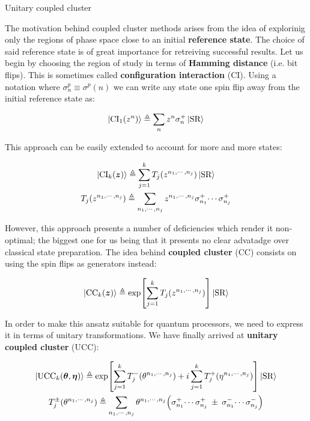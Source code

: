 \documentclass[9pt, handout, aspectratio=169]{beamer}	%
\begin{document}
\begin{frame}[allowframebreaks]{Unitary coupled cluster}

	The motivation behind coupled cluster methods arises from the idea of explorinig only the regions of phase space close to an initial \textbf{reference state}. The choice of said reference state is of great importance for retreiving successful results. Let us begin by choosing the region of study in terms of \textbf{Hamming distance} (i.e. bit flips). This is sometimes called \textbf{configuration interaction} (CI). Using a notation where $\sigma^{p}_{n} \equiv \sigma^{p}(n)$ we can write any state one spin flip away from the initial reference state as:

	\begin{gather*}
	  \ket{\text{CI}_{1} \qty(z^{n})} \triangleq
	    \sum_{n} z^{n} \sigma^{+}_{n} \ket{\text{SR}}
	\end{gather*}

	\vspace{-1em}

	This approach can be easily extended to account for more and more states:

	\begin{gather*}
	  \ket{\text{CI}_{k} \qty(\boldsymbol{z})} \triangleq
	    \sum_{j=1}^{k} T_{j} \qty(z^{n_1,\cdots,n_j}) \ket{\text{SR}} \\
	  T_{j} \qty(z^{n_1,\cdots,n_j}) \triangleq \sum_{n_1,\cdots,n_j}
	    z^{n_1,\cdots,n_j} \sigma^{+}_{n_1} \! \cdots \sigma^{+}_{n_j}
	\end{gather*}

\break

	However, this approach presents a number of deficiencies which render it non-optimal; the biggest one for us being that it presents no clear advatadge over classical state preparation. The idea behind \textbf{coupled cluster} (CC) consists on using the spin flips as generators instead:

	\begin{gather*}
	  \ket{\text{CC}_{k} \qty(\boldsymbol{z})} \triangleq
	    \exp[\sum_{j=1}^{k} T_{j} \qty(z^{n_1,\cdots,n_j})]
	    \ket{\text{SR}}
	\end{gather*}

	In order to make this ansatz suitable for quantum processors, we need to express it in terms of unitary transformations. We have finally arrived at \textbf{unitary coupled cluster} (UCC):

	\begin{gather*}
	  \ket{\text{UCC}_{k} \qty(\boldsymbol{\theta},\boldsymbol{\eta})} \triangleq
	    \exp[
	      \sum_{j=1}^{k} T_{j}^{-} \qty(\theta^{n_1,\cdots,n_j}) + i
	      \sum_{j=1}^{k} T_{j}^{+} \qty(\eta^{n_1,\cdots,n_j})
	    ]
	    \ket{\text{SR}} \\
	    T_{j}^{\pm} \qty(\theta^{n_1,\cdots,n_j}) \triangleq
	      \sum_{n_1,\cdots,n_j} \theta^{n_1,\cdots,n_j} \qty(
	        \sigma^{+}_{n_1} \! \cdots \sigma^{+}_{n_j} \: \pm \:
	        \sigma^{-}_{n_1} \! \cdots \sigma^{-}_{n_j}
	      )
	\end{gather*}


\end{frame}
\end{document}
